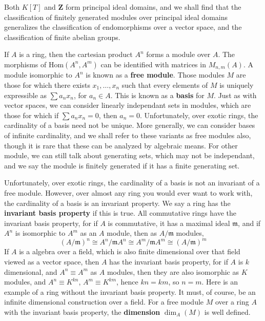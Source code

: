 Both $K[T]$ and $\mathbf{Z}$ form principal ideal domains, and we shall find that the classification of finitely generated modules over principal ideal domains generalizes the classification of endomorphisms over a vector space, and the classification of finite abelian groups.

\begin{example}
    If $A$ is a ring, then the cartesian product $A^n$ forms a module over $A$. The morphisms of $\text{Hom}(A^n, A^m)$ can be identified with matrices in $M_{n,m}(A)$. A module isomorphic to $A^n$ is known as a {\bf free module}. Those modules $M$ are those for which there exists $x_1, \dots, x_n$ such that every elements of $M$ is uniquely expressible as $\sum a_n x_n$, for $a_n \in A$. This is known as a {\bf basis} for $M$. Just as with vector spaces, we can consider linearly independant sets in modules, which are those for which if $\sum a_n x_n = 0$, then $a_n = 0$. Unfortunately, over exotic rings, the cardinality of a basis need not be unique. More generally, we can consider bases of infinite cardinality, and we shall refer to these variants as free modules also, though it is rare that these can be analyzed by algebraic means. For other module, we can still talk about generating sets, which may not be independant, and we say the module is finitely generated if it has a finite generating set.
\end{example}

Unfortunately, over exotic rings, the cardinality of a basis is not an invariant of a free module. However, over almost any ring you would ever want to work with, the cardinality of a basis is an invariant property. We say a ring has the {\bf invariant basis property} if this is true. All commutative rings have the invariant basis property, for if $A$ is commutative, it has a maximal ideal $\mathfrak{m}$, and if $A^n$ is isomorphic to $A^m$ as an $A$ module, then as $A/\mathfrak{m}$ modules,
%
\[ (A/\mathfrak{m})^n \cong A^n / \mathfrak{m}A^n \cong A^m/\mathfrak{m} A^m \cong (A/\mathfrak{m})^m  \]
%
If $A$ is a algebra over a field, which is also finite dimensional over that field viewed as a vector space, then $A$ has the invariant basis property, for if $A$ is $k$ dimensional, and $A^n \equiv A^m$ as $A$ modules, then they are also isomorphic as $K$ modules, and $A^n \equiv K^{kn}$, $A^m \equiv K^{km}$, hence $kn = km$, so $n = m$. Here is an example of a ring without the invariant basis property. It must, of course, be an infinite dimensional construction over a field. For a free module $M$ over a ring $A$ with the invariant basis property, the {\bf dimension} $\dim_A(M)$ is well defined.

